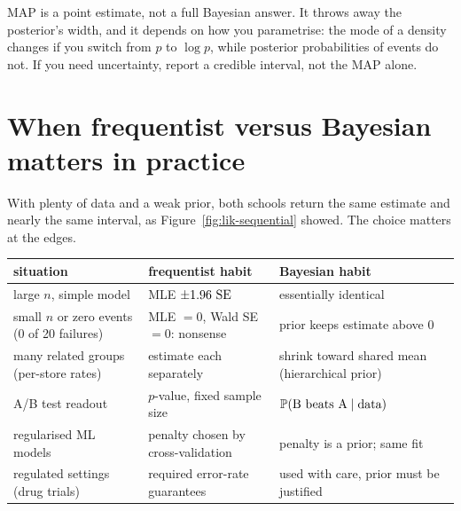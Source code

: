 \begin{trapbox}
MAP is a point estimate, not a full Bayesian answer. It throws away the posterior's
width, and it depends on how you parametrise: the mode of a density changes if you
switch from $p$ to $\log p$, while posterior probabilities of events do not. If you need
uncertainty, report a credible interval, not the MAP alone.
\end{trapbox}

\section{When frequentist versus Bayesian matters in practice}
\label{sec:lik-practice}

With plenty of data and a weak prior, both schools return the same estimate and nearly
the same interval, as Figure~\ref{fig:lik-sequential} showed. The choice matters at
the edges.

\begin{center}
\begin{tabular}{>{\raggedright\arraybackslash}p{4.2cm}>{\raggedright\arraybackslash}p{4cm}>{\raggedright\arraybackslash}p{4cm}}
\toprule
situation & frequentist habit & Bayesian habit \\
\midrule
large $n$, simple model & MLE $\pm 1.96\,\operatorname{SE}$ & essentially identical \\
small $n$ or zero events (0 of 20 failures) & MLE $=0$, Wald SE $=0$: nonsense & prior keeps estimate above $0$ \\
many related groups (per-store rates) & estimate each separately & shrink toward shared mean (hierarchical prior) \\
A/B test readout & $p$-value, fixed sample size & $\operatorname{\mathbb{P}}(\text{B beats A}\mid\text{data})$ \\
regularised ML models & penalty chosen by cross-validation & penalty is a prior; same fit \\
regulated settings (drug trials) & required error-rate guarantees & used with care, prior must be justified \\
\bottomrule
\end{tabular}
\end{center}

